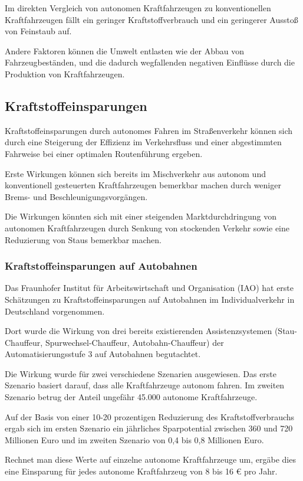Im direkten Vergleich von autonomen Kraftfahrzeugen zu konventionellen Kraftfahrzeugen
fällt ein geringer Kraftstoffverbrauch und ein geringerer Ausstoß von Feinstaub auf.

Andere Faktoren können die Umwelt entlasten wie der Abbau von Fahrzeugbeständen,
und die dadurch wegfallenden negativen Einflüsse durch die Produktion von Kraftfahrzeugen.

\subsection{Kraftstoffeinsparungen}
Kraftstoffeinsparungen durch autonomes Fahren im Straßenverkehr können sich durch
eine Steigerung der Effizienz im Verkehrsfluss und
einer abgestimmten Fahrweise bei einer optimalen Routenführung ergeben.

Erste Wirkungen können sich bereits im Mischverkehr aus autonom und konventionell gesteuerten Kraftfahrzeugen bemerkbar machen durch weniger
Brems- und Beschleunigungsvorgängen.

Die Wirkungen könnten sich mit einer steigenden Marktdurchdringung von autonomen Kraftfahrzeugen
durch Senkung von stockenden Verkehr sowie eine Reduzierung von Staus bemerkbar machen.

\subsubsection{Kraftstoffeinsparungen auf Autobahnen}
Das Fraunhofer Institut für Arbeitswirtschaft und Organisation (IAO) hat erste Schätzungen zu Kraftstoffeinsparungen auf Autobahnen im Individualverkehr in Deutschland vorgenommen.

Dort wurde die Wirkung von drei bereits existierenden Assistenzsystemen (Stau-Chauffeur, Spurwechsel-Chauffeur, Autobahn-Chauffeur)
der Automatisierungsstufe 3 auf Autobahnen begutachtet.

Die Wirkung wurde für zwei verschiedene Szenarien ausgewiesen.
Das erste Szenario basiert darauf, dass alle Kraftfahrzeuge autonom fahren.
Im zweiten Szenario betrug der Anteil ungefähr 45.000 autonome Kraftfahrzeuge.

Auf der Basis von einer 10-20 prozentigen Reduzierung des Kraftstoffverbrauchs ergab sich
im ersten Szenario ein jährliches Sparpotential zwischen 360 und 720 Millionen Euro und
im zweiten Szenario von 0,4 bis 0,8 Millionen Euro.

Rechnet man diese Werte auf einzelne autonome Kraftfahrzeuge um,
ergäbe dies eine Einsparung für jedes autonome Kraftfahrzeug von 8 bis 16 € pro Jahr.
\cite{Fraunhofer}

